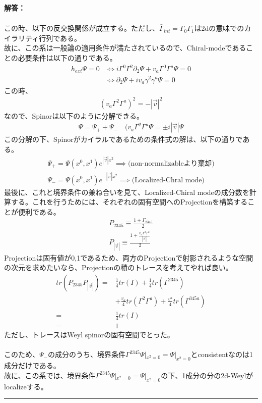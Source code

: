 \documentclass[dvipdfmx,a4paper,10.5pt]{article}
\numberwithin{equation}{section}
\newenvironment{answerbox}
{\begin{prooflabel}\textbf{解答：}\end{prooflabel}\vspace{0.8em}}
{\par\vspace{1em}\hrule\vspace{1em}}
\begin{document}
\begin{answerbox}
\begin{gather*}
    \end{gather*}
    この時、以下の反交換関係が成立する。ただし、$\bar{\Gamma}_{int}=\Gamma_{0}\Gamma_{1}$は2dの意味でのカイラリティ行列である。\\
    故に、この系は一般論の適用条件が満たされているので、Chiral-modeであることの必要条件は以下の通りである。
    \begin{align*}
        h_{ext}\Psi=0 &\iff i\Gamma^{0}\Gamma^{2}\partial_{2}\Psi +v_{a}\Gamma^{0}\Gamma^{a}\Psi=0\\
        &\iff \partial_{2}\Psi +iv_{a}\gamma^{2}\gamma^{a}\Psi=0
    \end{align*}
    この時、
    \begin{align*}
        (v_{a}\Gamma^{2}\Gamma^{a})^{2}=-|\vec{v}|^{2}
    \end{align*}
    なので、Spinorは以下のように分解できる。
    \begin{align*}
        \Psi=\Psi_{+}+\Psi_{-}\quad (v_{a}\Gamma^{2}\Gamma^{a}\Psi=\pm i|\vec{v}|\Psi
    \end{align*}
    この分解の下、Spinorがカイラルであるための条件式の解は、以下の通りである。
    \begin{align*}
        \Psi_{+}=\Psi(x^{0},x^{1})e^{|\vec{v}|x^{2}} \implies \text{(non-normalizableより棄却)}\\
        \Psi_{-}=\Psi(x^{0},x^{1})e^{-|\vec{v}|x^{2}}\implies \text{(Localized-Chral mode)}
    \end{align*}
    最後に、これと境界条件の兼ね合いを見て、Localized-Chiral modeの成分数を計算する。これを行うためには、それぞれの固有空間へのProjectionを構築することが便利である。
    \begin{gather*}
        P_{2345} \equiv \frac{1+\Gamma_{2345}}{2}\\
        P_{|\vec{v}|} \equiv \frac{ 1+\frac{v_{a}\Gamma^{2}\Gamma^{a}}{|\vec{v}|} }{2}
    \end{gather*}
    Projectionは固有値が0,1であるため、両方のProjectionで射影されるような空間の次元を求めたいなら、Projectionの積のトレースを考えてやれば良い。
    \begin{align*}
        tr(P_{2345}P_{|\vec{v}|})=&\frac{1}{4}tr(I)+\frac{1}{4}tr(\Gamma^{2345})\\
        &+\frac{v_{a}}{4}tr(\Gamma^{2}\Gamma^{a})+\frac{v^{a}}{4}tr(\Gamma^{345a})\\
        =&\frac{1}{4}tr(I)\\
        =&1
    \end{align*}
    ただし、トレースはWeyl spinorの固有空間でとった。\\
    \\
    このため、$\Psi_{-}$の成分のうち、境界条件$\Gamma^{2345}\Psi|_{x^{2}=0}=\Psi|_{x^{2}=0}$とconsistentなのは1成分だけである。\\
    故に、この系では、境界条件$\Gamma^{2345}\Psi|_{x^{2}=0}=\Psi|_{x^{2}=0}$の下、1成分の分の2d-Weylがlocalizeする。
\end{answerbox}
\end{document}
